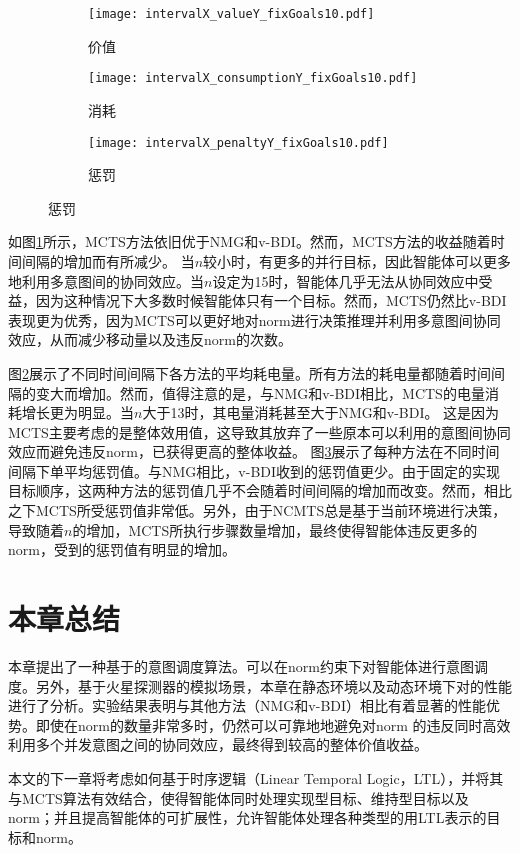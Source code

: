\begin{figure}
\centering
\begin{subfigure}{.47\textwidth}
\centering
\texttt{[image: intervalX\_valueY\_fixGoals10.pdf]}
\caption{价值}
\captionsetup{justification=centering}
\label{fig:intervalX_valueY_fixGoals10}
\end{subfigure}

\begin{subfigure}{.47\textwidth}
  \centering
  \texttt{[image: intervalX\_consumptionY\_fixGoals10.pdf]}
  \caption{消耗}
  \captionsetup{justification=centering}
  \label{fig:intervalX_consumptionY_fixGoals10}
\end{subfigure}
\begin{subfigure}{.47\textwidth}
  \centering
  \texttt{[image: intervalX\_penaltyY\_fixGoals10.pdf]}
  \caption{惩罚}
  \captionsetup{justification=centering}
  \label{fig:intervalX_penaltyY_fixGoals10}
\end{subfigure}
\captionsetup{justification=centering}
\label{fig:all_fixGoals10Norms30}
\end{figure}
如图\ref{fig:intervalX_valueY_fixGoals10}所示，MCTS方法依旧优于NMG和v-BDI。然而，MCTS方法的收益随着时间间隔的增加而有所减少。
当$n$较小时，有更多的并行目标，因此智能体可以更多地利用多意图间的协同效应。当$n$设定为15时，智能体几乎无法从协同效应中受益，因为这种情况下大多数时候智能体只有一个目标。然而，MCTS仍然比v-BDI表现更为优秀，因为MCTS可以更好地对norm进行决策推理并利用多意图间协同效应，从而减少移动量以及违反norm的次数。

图\ref{fig:intervalX_consumptionY_fixGoals10}展示了不同时间间隔下各方法的平均耗电量。所有方法的耗电量都随着时间间隔的变大而增加。然而，值得注意的是，与NMG和v-BDI相比，MCTS的电量消耗增长更为明显。当$n$大于13时，其电量消耗甚至大于NMG和v-BDI。
这是因为MCTS主要考虑的是整体效用值，这导致其放弃了一些原本可以利用的意图间协同效应而避免违反norm，已获得更高的整体收益。
图\ref{fig:intervalX_penaltyY_fixGoals10}展示了每种方法在不同时间间隔下单平均惩罚值。与NMG相比，v-BDI收到的惩罚值更少。由于固定的实现目标顺序，这两种方法的惩罚值几乎不会随着时间间隔的增加而改变。然而，相比之下MCTS所受惩罚值非常低。另外，由于NCMTS总是基于当前环境进行决策，导致随着$n$的增加，MCTS所执行步骤数量增加，最终使得智能体违反更多的norm，受到的惩罚值有明显的增加。
\section{本章总结}
本章提出了一种基于\SA 的意图调度算法\SAN 。\SAN 可以在norm约束下对智能体进行意图调度。另外，基于火星探测器的模拟场景，本章在静态环境以及动态环境下对\SAN 的性能进行了分析。实验结果表明\SAN 与其他方法（NMG和v-BDI）相比有着显著的性能优势。即使在norm的数量非常多时，\SAN 仍然可以可靠地地避免对norm
的违反同时高效利用多个并发意图之间的协同效应，最终得到较高的整体价值收益。

本文的下一章将考虑如何基于时序逻辑（Linear Temporal Logic，LTL），并将其与MCTS算法有效结合，使得智能体同时处理实现型目标、维持型目标以及norm；并且提高智能体的可扩展性，允许智能体处理各种类型的用LTL表示的目标和norm。
